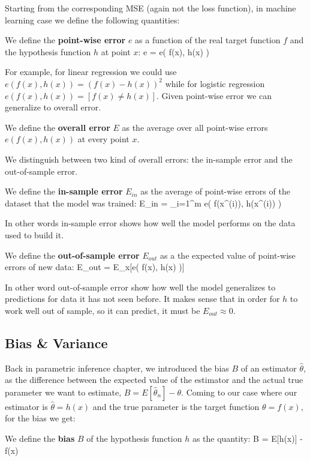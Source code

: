 Starting from the corresponding MSE (again not the loss function), in machine learning case we define the following
quantities:

We define the \textbf{point-wise error} $e$ as a function of the real target function $f$ and the hypothesis function
$h$ at point $x$:
\bse
e = e( f(x), h(x) )
\ese
\ed

For example, for linear regression we could use $e( f(x), h(x) ) = (f(x) - h (x))^2$ while for logistic regression $e
( f(x), h(x) ) = [f(x) \neq h(x)]$. Given point-wise error we can generalize to overall error.

We define the \textbf{overall error} $E$ as the average over all point-wise errors $e( f(x), h(x) )$ at every point $x$.
\ed

We distinguish between two kind of overall errors: the in-sample error and the out-of-sample error.

We define the \textbf{in-sample error} $E_{in}$ as the average of point-wise errors of the dataset that the model was
trained:
\bse
E_{in} =  \sum_{i=1}^m e( f(x^{(i)}), h(x^{(i)}) )
\ese
\ed

In other words in-sample error shows how well the model performs on the data used to build it.

We define the \textbf{out-of-sample error} $E_{out}$ as a the expected value of point-wise errors of new data:
\bse
E_{out} = E_{x}[e( f(x), h(x) )]
\ese
\ed

In other word out-of-sample error show how well the model generalizes to predictions for data it has not seen before.
It makes sense that in order for $h$ to work well out of sample, so it can predict, it must be $E_{out} \approx 0$.

\subsection{Bias \& Variance}

Back in parametric inference chapter, we introduced the bias $B$ of an estimator $\hat{\theta}$, as the difference
between the expected value of the estimator and the actual true parameter we want to estimate, $B =
E[\hat{\theta}_{n}] - \theta$. Coming to our case where our estimator is $\hat{\theta} = h(x)$ and the true parameter
is the target function $\theta = f(x)$, for the bias we get:

\bd[Bias]
We define the \textbf{bias} $B$ of the hypothesis function $h$ as the quantity:
\bse
B = E[h(x)] - f(x)
\ese
\ed

